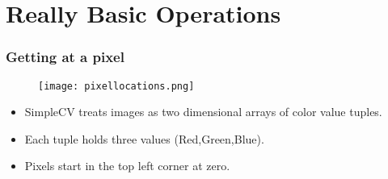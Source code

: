 \documentclass[compress]{beamer}
\begin{document}
\section{Really Basic Operations}
\begin{frame}
\frametitle{Getting at a pixel}
\begin{figure}
  \texttt{[image: pixellocations.png]}
\end{figure}
\begin{itemize}
\item SimpleCV treats images as two dimensional arrays of color
value tuples. 
\item Each tuple holds three values (Red,Green,Blue).
\item Pixels start in the top left corner at zero. 
\end{itemize}
\end{frame}
\end{document}
